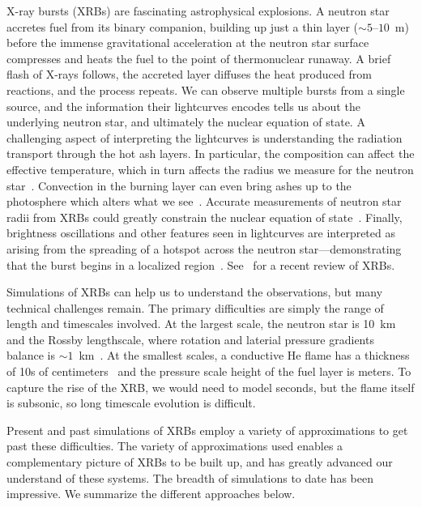\documentclass[a4paper]{jpconf}
\begin{document}
X-ray bursts (XRBs) are fascinating astrophysical explosions.  A
neutron star accretes fuel from its binary companion, building up just
a thin layer ($\sim 5$--$10$~m) before the immense gravitational
acceleration at the neutron star surface compresses and heats the fuel
to the point of thermonuclear runaway.  A brief flash of X-rays
follows, the accreted layer diffuses the heat produced from reactions,
and the process repeats.  We can observe multiple bursts from a single
source, and the information their lightcurves encodes tells us about
the underlying neutron star, and ultimately the nuclear equation of
state.  A challenging aspect of interpreting the lightcurves is
understanding the radiation transport through the hot ash layers.  In
particular, the composition can affect the effective temperature,
which in turn affects the radius we measure for the neutron
star~\cite{suleimanov:2011}.  Convection in the burning layer can even
bring ashes up to the photosphere which alters what we
see~\cite{kajava:2017}.  Accurate measurements of neutron star radii
from XRBs could greatly constrain the nuclear equation of
state~\cite{steiner:2010,ozel:2010}.  Finally, brightness oscillations
and other features seen in lightcurves are interpreted as arising from
the spreading of a hotspot across the neutron star---demonstrating
that the burst begins in a localized
region~\cite{bhattacharyya:2006,bhattacharyya:2007}.
See~\cite{galloway:2017} for a recent review of XRBs.

Simulations of XRBs can help us to understand the observations, but
many technical challenges remain.  The primary difficulties are simply
the range of length and timescales involved.  At the largest scale,
the neutron star is 10~km and the Rossby lengthscale, where rotation
and laterial pressure gradients balance is $\sim
1$~km~\cite{SPIT_ETAL02}.  At the smallest scales, a conductive He
flame has a thickness of 10s of centimeters~\cite{Timmes00} and the
pressure scale height of the fuel layer is meters.  To capture the
rise of the XRB, we would need to model seconds, but the flame itself
is subsonic, so long timescale evolution is difficult.

Present and past simulations of XRBs employ a variety of
approximations to get past these difficulties.  The variety of
approximations used enables a complementary picture of XRBs to be built up, 
and has greatly advanced our understand of these systems.  
The breadth of simulations to date has been impressive.  We summarize
the different approaches below.
\end{document}
